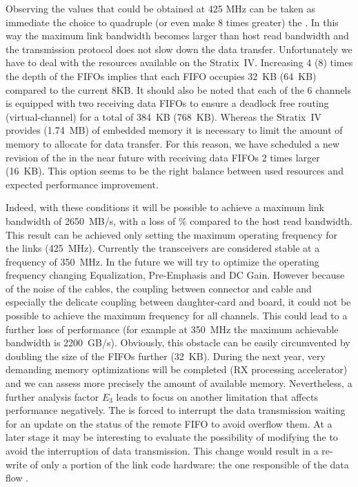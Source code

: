 Observing the values that could be obtained at 425 MHz can be taken as
immediate the choice to quadruple (or even make 8 times greater) the
. In this way the maximum link bandwidth becomes
larger than host read bandwidth and the transmission protocol does not
slow down the data transfer.
Unfortunately we have to deal with the resources available on the
Stratix~IV.  Increasing 4 (8) times the depth of the FIFOs implies
that each FIFO occupies 32~KB (64~KB) compared to the current 8KB. It
should also be noted that each of the 6 channels is equipped with two
receiving data FIFOs to ensure a deadlock free routing
(virtual-channel) for a total of 384~KB (768~KB). Whereas the
Stratix~IV provides (1.74~MB) of embedded memory it is necessary to
limit the amount of memory to allocate for data transfer.
For this reason, we have scheduled a new revision of the  in the near future with receiving data FIFOs 2 times larger
(16~KB).  This option seems to be the right balance between used
resources and expected performance improvement.

Indeed, with these conditions it will be possible to achieve a maximum
link bandwidth of 2650~MB/s, with a loss of \% compared
to the host read bandwidth.
This result can be achieved only setting the maximum operating
frequency for the links (425~MHz). Currently the transceivers are
considered stable at a frequency of 350~MHz. In the future we will try
to optimize the operating frequency changing Equalization, 
Pre-Emphasis and DC Gain. However because of
the noise of the cables, the coupling between connector and cable and
especially the delicate coupling between daughter-card and board, it
could not be possible to achieve the maximum frequency for all
channels.  This could lead to a further loss of performance (for
example at 350~MHz the maximum achievable bandwidth is 2200~GB/s).
Obviously, this obstacle can be easily circumvented by doubling the
size of the FIFOs further (32~KB). During the next year, very
demanding memory optimizations will be completed (RX processing
accelerator) and we can assess more precisely the amount of available
memory.
Nevertheless, a further analysis factor $E_{3}$ leads to focus on
another limitation that affects performance negatively. The  is forced to interrupt the data transmission waiting for an
update on the status of the remote FIFO to avoid overflow them.
At a later stage it may be interesting to evaluate the possibility of
modifying the  to avoid the interruption of data
transmission.  This change would result in a re-write of only a
portion of the link code hardware: the one responsible of the data
flow .



